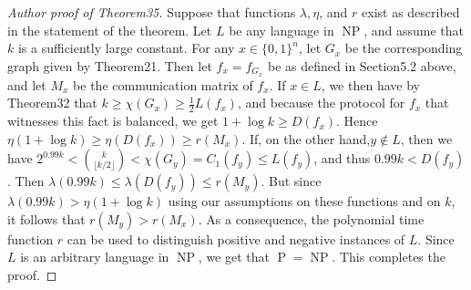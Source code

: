 \documentclass[10pt,a4paper]{article}
\begin{document}
\begin{proof}[Author proof of Theorem35]
Suppose that functions $\lambda,\eta$, and $r$ exist as described in the statement of the theorem. Let $L$ be any language in $\operatorname{NP}$, and assume that $k$ is a sufficiently large constant. For any $x\in\{0,1\}^n$, let $G_x$ be the corresponding graph given by Theorem21. Then let $f_x=f_{G_x}$ be as defined in Section5.2 above, and let $M_x$ be the communication matrix of $f_x$. If $x\in L$, we then have by Theorem32 that $k\geq\chi(G_x)\geq\frac12L(f_x)$, and because the protocol for $f_x$ that witnesses this fact is balanced, we get $1+\log k\geq D(f_x)$. Hence $\eta(1+\log k)\geq\eta(D(f_x))\geq r(M_x)$. If, on the other hand,$y\notin L$, then we have $2^{0.99k}<\binom k{\lfloor k/2\rfloor}<\chi(G_y)=C_1(f_y)\leq L(f_y)$, and thus $0.99k<D(f_y)$. Then $\lambda(0.99k)\leq\lambda(D(f_y))\leq r(M_y)$. But since $\lambda(0.99k)>\eta(1+\log k)$ using our assumptions on these functions and on $k$, it follows that $r(M_y)>r(M_x)$. As a consequence, the polynomial time function $r$ can be used to distinguish positive and negative instances of $L$. Since $L$ is an arbitrary language in $\operatorname{NP}$, we get that $\operatorname P=\operatorname{NP}$. This completes the proof.
\end{proof}
\end{document}
